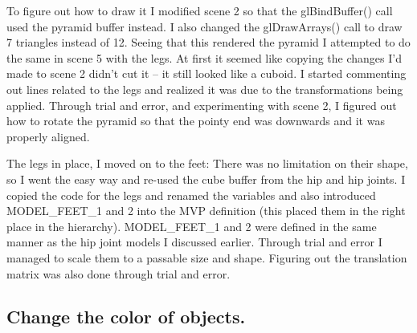To figure out how to draw it I modified scene 2 so that the glBindBuffer() call used the pyramid buffer instead.
I also changed the glDrawArrays() call to draw 7 triangles instead of 12.
Seeing that this rendered the pyramid I attempted to do the same in scene 5 with the legs.
At first it seemed like copying the changes I'd made to scene 2 didn't cut it -- it still looked like a cuboid.
I started commenting out lines related to the legs and realized it was due to the transformations being applied.
Through trial and error, and experimenting with scene 2, I figured out how to rotate the pyramid so that the pointy end was downwards and it was properly aligned.

The legs in place, I moved on to the feet:
There was no limitation on their shape, so I went the easy way and re-used the cube buffer from the hip and hip joints.
I copied the code for the legs and renamed the variables and also introduced MODEL\_FEET\_1 and 2 into the MVP definition (this placed them in the right place in the hierarchy).
MODEL\_FEET\_1 and 2 were defined in the same manner as the hip joint models I discussed earlier.
Through trial and error I managed to scale them to a passable size and shape.
Figuring out the translation matrix was also done through trial and error.

\subsection{Change the color of objects.}
